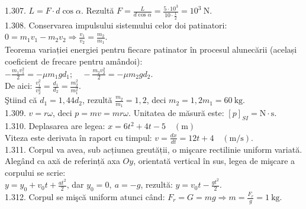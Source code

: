 1.307. $L=F \cdot d \cos \alpha$. Rezultă $F=\frac{L}{d \cos \alpha}=\frac{5 \cdot 10^{3}}{10 \cdot \frac{1}{2}}=10^{3} \mathrm{~N}$.\\

1.308. Conservarea impulsului sistemului celor doi patinatori:\\ $0=m_{1} v_{1}-m_{2} v_{2} \Rightarrow \frac{v_{1}}{v_{2}}=\frac{m_{2}}{m_{1}}$.\\ Teorema variației energiei pentru fiecare patinator în procesul alunecării (același coeficient de frecare pentru amândoi):\\ $-\frac{m_{1} v_{1}^{2}}{2}=-\mu m_{1} g d_{1}; \quad -\frac{m_{2} v_{2}^{2}}{2}=-\mu m_{2} g d_{2}$.\\ De aici: $\frac{v_{1}^{2}}{v_{2}^{2}}=\frac{d_{1}}{d_{2}}=\frac{m_{2}^{2}}{m_{1}^{2}}$.\\ Ştiind că $d_{1}=1,44 d_{2}$, rezultă $\frac{m_{2}}{m_{1}}=1,2$, deci $m_{2}=1,2 m_{1}=60 \mathrm{~kg}$.\\

1.309. $v=r \omega$, deci $p=m v=m r \omega$. Unitatea de măsură este: ${[p]_{S I}=\mathrm{N} \cdot \mathrm{s}}$.\\

1.310. Deplasarea are legea: $x=6 t^{2}+4 t-5 \quad (\mathrm{m})$\\ Viteza este derivata în raport cu timpul: $v=\frac{d x}{d t}=12 t+4 \quad(\mathrm{m} / \mathrm{s})$.\\

1.311. Corpul va avea, sub acțiunea greutății, o mişcare rectilinie uniform variată. Alegând ca axă de referință axa $Oy$, orientată vertical în sus, legea de mişcare a corpului se scrie:\\ $y=y_{0}+v_{0} t+\frac{a t^{2}}{2}$, dar $y_{0}=0,\ a=-g$, rezultă: $y=v_{0} t-\frac{g t^{2}}{2}$.\\

1.312. Corpul se mişcă uniform atunci când: $F_{r}=G=m g \Rightarrow m=\frac{F_{r}}{g}=1 \mathrm{~kg}$.\\

